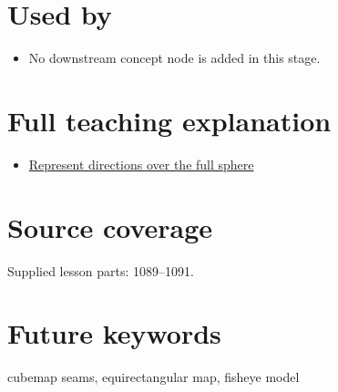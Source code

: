 \section{Used by}\label{appendix-fc99ad39f351-used-by}

\begin{itemize}
\tightlist
\item
  No downstream concept node is added in this stage.
\end{itemize}

\section{Full teaching explanation}\label{appendix-fc99ad39f351-full-teaching-explanation}

\begin{itemize}
\tightlist
\item
  \href{Continuous\%20Notes/Computing\%20Foundations\%20-\%20From\%20Bits\%20to\%20C++\%20and\%20Systems\%20APIs\#Represent\%20directions\%20over\%20the\%20full\%20sphere}{Represent directions over the full sphere}
\end{itemize}

\section{Source coverage}\label{appendix-fc99ad39f351-source-coverage}

Supplied lesson parts: 1089--1091.

\section{Future keywords}\label{appendix-fc99ad39f351-future-keywords}

cubemap seams, equirectangular map, fisheye model
